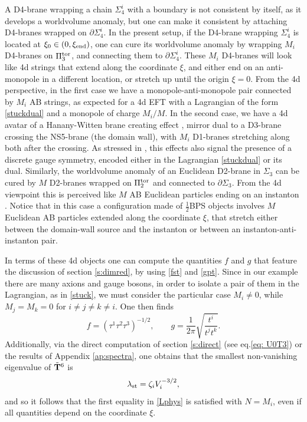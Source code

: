 \documentclass[11pt]{article}
\def\be{\begin{equation}}
\def\ee{\end{equation}}
\def\oh{\frac{1}{2}}
\def\p {{\partial}}
\begin{document}
A D4-brane wrapping a chain $\Sigma_4^i$ with a boundary is not consistent by itself, as it develops a worldvolume anomaly, but one can make it consistent by attaching D4-branes wrapped on $\p \Sigma_4^i$. In the present setup, if the D4-brane wrapping $\Sigma_4^i$ is located at $\xi_0 \in (0, \xi_{\rm end})$, one can cure its worldvolume anomaly by wrapping $M_i$ D4-branes on $\Pi_3^{\rm tor}$, and connecting them to $\p \Sigma_4^i$. These $M_i$ D4-branes will look like 4d strings that extend along the coordinate $\xi$, and either end on an anti-monopole in a different location, or stretch up until the origin $\xi=0$. From the 4d perspective, in the first case we have a monopole-anti-monopole pair connected by $M_i$ AB strings, as expected for a 4d EFT with a Lagrangian of the form \eqref{stuckdual} and a monopole of charge $M_i/M$. In the second case, we have a 4d avatar of a Hanany-Witten brane creating effect \cite{Hanany:1996ie}, mirror dual to a D3-brane crossing the NS5-brane (the domain wall), with $M_i$ D1-branes stretching along both after the crossing. As stressed in \cite{Berasaluce-Gonzalez:2012awn}, this effects also signal the presence of a discrete gauge symmetry, encoded either in the Lagrangian \eqref{stuckdual} or its dual. Similarly, the worldvolume anomaly of an Euclidean D2-brane in $\Sigma_3$ can be cured by $M$ D2-branes wrapped on $\Pi_2^{\rm tor}$ and connected to $\p \Sigma_3$. From the 4d viewpoint this is perceived like $M$ AB Euclidean particles ending on an instanton \cite{Banks:2010zn}. Notice that in this case a configuration made of $\oh$BPS objects involves $M$ Euclidean AB particles extended along the coordinate $\xi$, that stretch either between the domain-wall source and the instanton or between an instanton-anti-instanton pair.



In terms of these 4d objects one can compute the quantities $f$ and $g$ that feature the discussion of section \ref{s:dimred}, by using \eqref{fst} and \eqref{gpt}. Since in our example there are many axions and gauge bosons, in order to isolate a pair of them in the Lagrangian, as in \eqref{stuck}, we must consider the particular case $M_i \neq 0$, while $M_j = M_k =0$ for $i\neq j \neq k \neq i$. One then finds 
\be
f = \left( \tau^1\tau^2 \tau^3 \right)^{-1/2} , \qquad g = \frac{1}{2\pi} \sqrt{\frac{t^i} {t^j t^k }} .
\label{fandg}
\ee
Additionally, via the direct computation of section \ref{s:direct} (see eq.\eqref{eq: U0T3}) or the results of Appendix \ref{ap:spectra}, one obtains that the smallest non-vanishing eigenvalue of $\tilde{\bf T}^6$ is
\be
\lambda_{\rm st} =  \zeta_i V_i^{-3/2} ,
\label{lamstex}
\ee
and so it follows that the first equality in \eqref{Lphys} is satisfied with $N=M_i$, even if all quantities depend on the coordinate $\xi$. %
\end{document}
